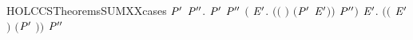 \begin{SaveVerbatim}{HOLCCSTheoremsSUMXXcases}
\HOLTokenTurnstile{} \HOLSymConst{\HOLTokenForall{}} \ensuremath{\HOLBoundVar{P}\sp{\prime{}}}  \ensuremath{\HOLBoundVar{P}\sp{\prime{}\prime{}}}.
      \HOLSymConst{\ensuremath{+}} \ensuremath{\HOLBoundVar{P}\sp{\prime{}}} \HOLTokenTransBegin{}\HOLTokenTransEnd \ensuremath{\HOLBoundVar{P}\sp{\prime{}\prime{}}} \HOLSymConst{\HOLTokenImp{}}
     \ensuremath{(}\HOLSymConst{\HOLTokenExists{}} \ensuremath{\HOLBoundVar{E}\sp{\prime{}}}. \ensuremath{(}\ensuremath{(} \HOLSymConst{\ensuremath{=}} \ensuremath{)} \HOLSymConst{\HOLTokenConj{}} \ensuremath{(}\ensuremath{\HOLBoundVar{P}\sp{\prime{}}} \HOLSymConst{\ensuremath{=}} \ensuremath{\HOLBoundVar{E}\sp{\prime{}}}\ensuremath{)}\ensuremath{)} \HOLSymConst{\HOLTokenConj{}}  \HOLTokenTransBegin{}\HOLTokenTransEnd \ensuremath{\HOLBoundVar{P}\sp{\prime{}\prime{}}}\ensuremath{)} \HOLSymConst{\HOLTokenDisj{}}
     \HOLSymConst{\HOLTokenExists{}} \ensuremath{\HOLBoundVar{E}\sp{\prime{}}}. \ensuremath{(}\ensuremath{(} \HOLSymConst{\ensuremath{=}} \ensuremath{\HOLBoundVar{E}\sp{\prime{}}}\ensuremath{)} \HOLSymConst{\HOLTokenConj{}} \ensuremath{(}\ensuremath{\HOLBoundVar{P}\sp{\prime{}}} \HOLSymConst{\ensuremath{=}} \ensuremath{)}\ensuremath{)} \HOLSymConst{\HOLTokenConj{}}  \HOLTokenTransBegin{}\HOLTokenTransEnd \ensuremath{\HOLBoundVar{P}\sp{\prime{}\prime{}}}
\end{SaveVerbatim}
\newcommand{\HOLCCSTheoremsSUMXXcases}{\UseVerbatim{HOLCCSTheoremsSUMXXcases}}
